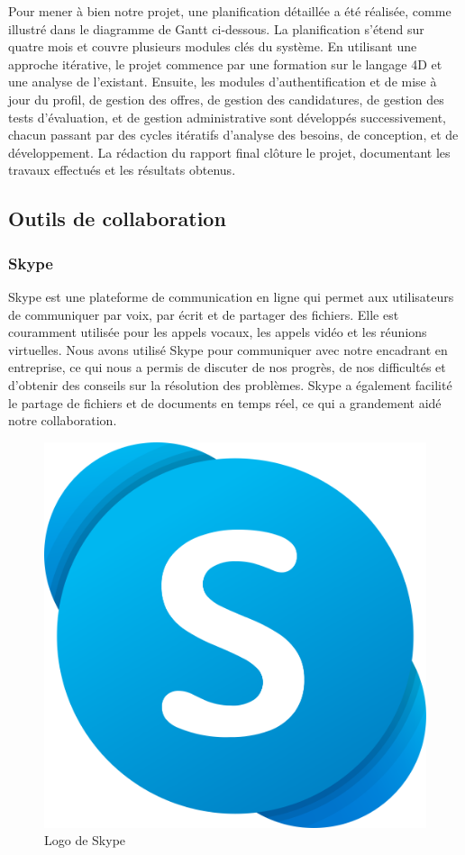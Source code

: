 Pour mener à bien notre projet, une planification détaillée a été réalisée, comme illustré dans le diagramme de Gantt ci-dessous. 
La planification s'étend sur quatre mois et couvre plusieurs modules clés du système. En utilisant une approche itérative, le projet commence 
par une formation sur le langage 4D et une analyse de l'existant. Ensuite, les modules d'authentification et de mise à jour du profil, 
de gestion des offres, de gestion des candidatures, de gestion des tests d'évaluation, et de gestion administrative sont développés successivement, 
chacun passant par des cycles itératifs d'analyse des besoins, de conception, et de développement. La rédaction du rapport final clôture le projet, 
documentant les travaux effectués et les résultats obtenus.

\subsection{Outils de collaboration}
\subsubsection{Skype}
Skype est une plateforme de communication en ligne qui permet aux utilisateurs de communiquer par voix, par écrit et de partager des fichiers. 
Elle est couramment utilisée pour les appels vocaux, les appels vidéo et les réunions virtuelles. Nous avons utilisé Skype pour communiquer 
avec notre encadrant en entreprise, ce qui nous a permis de discuter de nos progrès, de nos difficultés et d'obtenir des conseils sur 
la résolution des problèmes. Skype a également facilité le partage de fichiers et de documents en temps réel, ce qui a grandement aidé notre 
collaboration.
\begin{figure}[h]
    \centering
    \includegraphics[scale=0.1]{Images/skype.png} %
    \caption{Logo de Skype\cite{skype}}
    \label{fig:gantt}
\end{figure}

